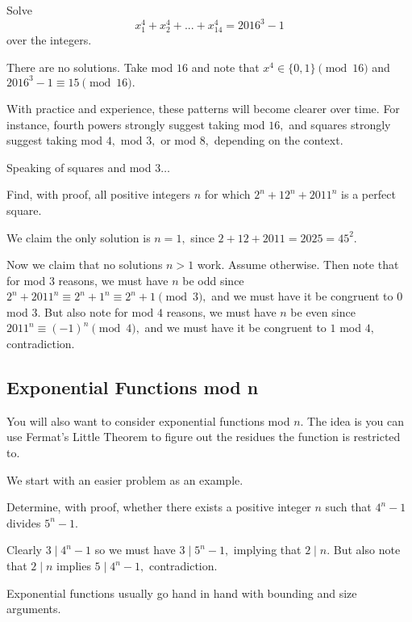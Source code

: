 \documentclass[blue,onecol]{shooting}
\begin{document}
\begin{exam}
Solve
\[x_{1}^4 + x_{2}^4 +...+ x_{14}^4=2016^3 - 1\]
over the integers.
\end{exam}

\begin{sol}
There are no solutions. Take mod $16$ and note that $x^4\in \{0,1\}\pmod{16}$ and $2016^3-1\equiv 15\pmod{16}.$
\end{sol}

With practice and experience, these patterns will become clearer over time. For instance, fourth powers strongly suggest taking mod $16,$ and squares strongly suggest taking mod $4,$ mod $3,$ or mod $8,$ depending on the context.

Speaking of squares and mod $3\ldots$

\begin{exam}[USAJMO 2011/1]
Find, with proof, all positive integers $n$ for which $2^n + 12^n + 2011^n$ is a perfect square.
\end{exam}

\begin{sol}
We claim the only solution is $n=1,$ since $2+12+2011=2025=45^2.$

Now we claim that no solutions $n>1$ work. Assume otherwise. Then note that for mod $3$ reasons, we must have $n$ be odd since $2^n+2011^n\equiv 2^n+1^n\equiv 2^n+1\pmod{3},$ and we must have it be congruent to $0$ mod $3.$ But also note for mod $4$ reasons, we must have $n$ be even since $2011^n\equiv (-1)^n\pmod{4},$ and we must have it be congruent to $1$ mod $4,$ contradiction.
\end{sol}

\subsection{Exponential Functions mod n}
You will also want to consider exponential functions mod $n.$ The idea is you can use Fermat's Little Theorem to figure out the residues the function is restricted to.

We start with an easier problem as an example.

\begin{exam}
Determine, with proof, whether there exists a positive integer $n$ such that $4^n-1$ divides $5^n-1.$
\end{exam}

\begin{sol}
Clearly $3\mid 4^n-1$ so we must have $3\mid 5^n-1,$ implying that $2\mid n.$ But also note that $2\mid n$ implies $5\mid 4^n-1,$ contradiction.
\end{sol}
Exponential functions usually go hand in hand with bounding and size arguments.
\end{document}
